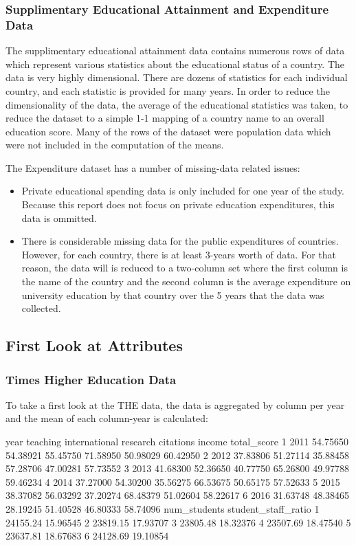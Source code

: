 \documentclass[12pt]{article}
\begin{document}
\subsubsection{Supplimentary Educational Attainment and Expenditure Data}
The supplimentary educational attainment data contains numerous rows of data which represent various statistics about the educational status of a country. The data is very highly dimensional. There are dozens of statistics for each individual country, and each statistic is provided for many years. In order to reduce the dimensionality of the data, the average of the educational statistics was taken, to reduce the dataset to a simple 1-1 mapping of a country name to an overall education score. Many of the rows of the dataset were population data which were not included in the computation of the means.

The Expenditure dataset has a number of missing-data related issues:
\begin{itemize}
\item Private educational spending data is only included for one year of the study. Because this report does not focus on private education expenditures, this data is ommitted.
\item There is considerable missing data for the public expenditures of countries. However, for each country, there is at least 3-years worth of data. For that reason, the data will is reduced to a two-column set where the first column is the name of the country and the second column is the average expenditure on university education by that country over the 5 years that the data was collected.
\end{itemize}

\subsection{First Look at Attributes}
\subsubsection{Times Higher Education Data}
To take a first look at the THE data, the data is aggregated by column per year and the mean of each column-year is calculated:

\begin{Schunk}
\begin{Soutput}
  year teaching international research citations   income total_score
1 2011 54.75650      54.38921 55.45750  71.58950 50.98029    60.42950
2 2012 37.83806      51.27114 35.88458  57.28706 47.00281    57.73552
3 2013 41.68300      52.36650 40.77750  65.26800 49.97788    59.46234
4 2014 37.27000      54.30200 35.56275  66.53675 50.65175    57.52633
5 2015 38.37082      56.03292 37.20274  68.48379 51.02604    58.22617
6 2016 31.63748      48.38465 28.19245  51.40528 46.80333    58.74096
  num_students student_staff_ratio
1     24155.24            15.96545
2     23819.15            17.93707
3     23805.48            18.32376
4     23507.69            18.47540
5     23637.81            18.67683
6     24128.69            19.10854
\end{Soutput}
\end{Schunk}
\end{document}
